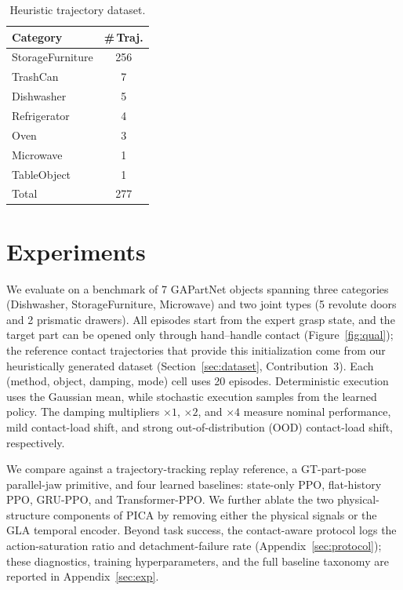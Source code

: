 \documentclass{article}
\begin{document}
\begin{table}
    \vspace{-1.0em}
    \centering
    \caption{Heuristic trajectory dataset.}
    \label{tab:dataset}
    \small
    \setlength{\tabcolsep}{4pt}
    \begin{tabular}{lc}
        \toprule
        Category & \#\,Traj. \\
        \midrule
        StorageFurniture & 256 \\
        TrashCan         & 7 \\
        Dishwasher       & 5 \\
        Refrigerator     & 4 \\
        Oven             & 3 \\
        Microwave        & 1 \\
        TableObject           & 1 \\
        \midrule
        Total            & 277 \\
        \bottomrule
    \end{tabular}
    \vspace{-1.0em}
\end{table}





\section{Experiments}
\label{sec:result}
\label{sec:exp_main}

We evaluate on a benchmark of 7 GAPartNet objects spanning three categories (Dishwasher, StorageFurniture, Microwave) and two joint types (5 revolute doors and 2 prismatic drawers). All episodes start from the expert grasp state, and the target part can be opened only through hand--handle contact (Figure~\ref{fig:qual}); the reference contact trajectories that provide this initialization come from our heuristically generated dataset (Section~\ref{sec:dataset}, Contribution~3). Each (method, object, damping, mode) cell uses 20 episodes. Deterministic execution uses the Gaussian mean, while stochastic execution samples from the learned policy. The damping multipliers $\times1$, $\times2$, and $\times4$ measure nominal performance, mild contact-load shift, and strong out-of-distribution (OOD) contact-load shift, respectively.

We compare against a trajectory-tracking replay reference, a GT-part-pose parallel-jaw primitive, and four learned baselines: state-only PPO, flat-history PPO, GRU-PPO, and Transformer-PPO. We further ablate the two physical-structure components of PICA by removing either the physical signals or the GLA temporal encoder. Beyond task success, the contact-aware protocol logs the action-saturation ratio and detachment-failure rate (Appendix~\ref{sec:protocol}); these diagnostics, training hyperparameters, and the full baseline taxonomy are reported in Appendix~\ref{sec:exp}.
\end{document}
